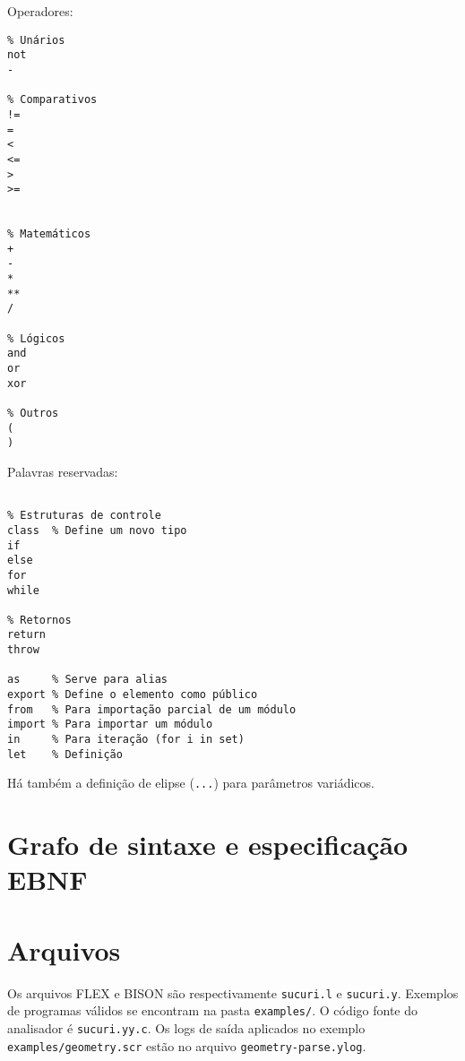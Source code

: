 \documentclass[headings=standardclasses, headings=big]{scrreprt}
\begin{document}
Operadores:

\begin{verbatim}
% Unários
not
-

% Comparativos
!=
=
<
<=
>
>=


% Matemáticos
+
-
*
**
/

% Lógicos
and
or
xor

% Outros
(
)

\end{verbatim}

Palavras reservadas:

\begin{verbatim}

% Estruturas de controle
class  % Define um novo tipo
if
else
for
while

% Retornos
return
throw

as     % Serve para alias
export % Define o elemento como público
from   % Para importação parcial de um módulo
import % Para importar um módulo
in     % Para iteração (for i in set)
let    % Definição
\end{verbatim}

Há também a definição de elipse (\texttt{...}) para parâmetros variádicos.

\clearpage

\section{Grafo de sintaxe e especificação EBNF}



\clearpage

\section{Arquivos}

Os arquivos FLEX e BISON são respectivamente \texttt{sucuri.l} e
\texttt{sucuri.y}. Exemplos de programas válidos se encontram na pasta
\texttt{examples/}. O código fonte do analisador é \texttt{sucuri.yy.c}.  Os
logs de saída aplicados no exemplo \texttt{examples/geometry.scr} estão no
arquivo \texttt{geometry-parse.ylog}.
\end{document}
